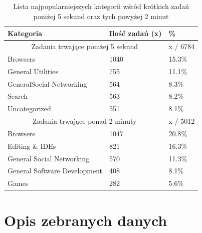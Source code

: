 \documentclass[openright]{xmgr}
\begin{document}
	    \begin{table}[]
        \centering
        \begin{tabular}{|l|l|l|}
            \hline
            Kategoria                           & Ilość zadań (x)   & \%      \\ \hline
            \multicolumn{2}{|c|}{Zadania trwające poniżej 5 sekund} & x / 6784\\ \hline
            Browsers                            & 1040              & 15.3\%  \\ \hline
            General Utilities                   & 755               & 11.1\%  \\ \hline
            GeneralSocial Networking            & 564               & 8.3\%   \\ \hline
            Search                              & 563               & 8.2\%   \\ \hline
            Uncategorized                       & 551               & 8.1\%   \\ \hline
            \multicolumn{2}{|c|}{Zadania trwające ponad 2 minuty}   & x / 5012\\ \hline
            Browsers                            & 1047              & 20.8\%  \\ \hline
            Editing \& IDEs                     & 821               & 16.3\%  \\ \hline
            General Social Networking           & 570               & 11.3\%  \\ \hline
            General Software Development        & 408               & 8.1\%   \\ \hline
            Games                               & 282               & 5.6\%   \\ \hline
        \end{tabular}
        \caption{Lista najpopularniejszych kategorii wśród krótkich zadań poniżej 5 sekund oraz tych powyżej 2 minut}
        \label{Zadania krótkie i długie, które są najpopularniejsze?}
        \end{table}

\section{Opis zebranych danych}
\end{document}
